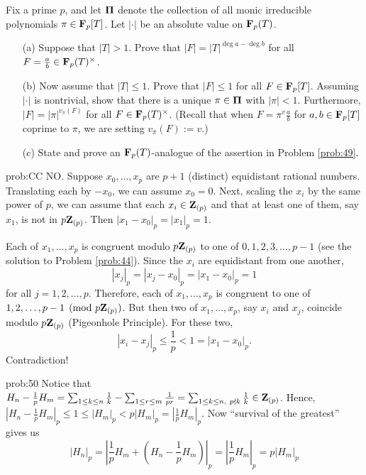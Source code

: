 \begin{challenge} Fix a prime $p$, and let $\bm{\mathrm{\Pi}}$ denote the collection of all monic irreducible polynomials $\pi \in \mathbf{F}_p[T]$. Let $|\cdot|$ be an absolute value on $\mathbf{F}_p(T)$.
\vspace{-0.12in}
\begin{enumerate}
\item[(a)] Suppose that $|T| > 1$. Prove that $|F| = |T|^{\deg{a}-\deg{b}}$ for all $F =\frac{a}{b}\in \mathbf{F}_p(T)^{\times}$.\item[(b)] Now assume that $|T| \le 1$. Prove that $|F|\le 1$ for all $F \in \mathbf{F}_p[T]$. Assuming $|\cdot|$ is nontrivial, show that there is a unique $\pi \in \raisebox{-0.25pt}{$\bmPi$}$ with $|\pi| < 1$. Furthermore, $|F| = |\pi|^{v_\pi(F)}$ for all $F \in \mathbf{F}_p(T)^{\times}$. (Recall that when $F=\pi^{v} \frac{a}{b}$ for $a,b \in \mathbf{F}_p[T]$ coprime to $\pi$, we are setting $v_{\pi}(F):=v$.)
\item[(c)] State and prove an $\mathbf{F}_p(T)$-analogue of the assertion in Problem \ref{prob:49}. 
\end{enumerate}

\end{challenge}

\begin{sol}{prob:CC} NO. Suppose $x_0, \dots, x_{p}$ are $p+1$ (distinct) equidistant rational numbers. Translating each by $-x_0$, we can assume $x_0= 0$. Next, scaling the $x_i$ by the same power of $p$, we can assume that each $x_i \in \mathbf{Z}_{(p)}$ and that at least one of them, say $x_1$, is not in $p\mathbf{Z}_{(p)}$. Then $|x_1-x_0|_p = |x_1|_p= 1$. 

Each of $x_1,\dots,x_{p}$ is congruent modulo $p\mathbf{Z}_{(p)}$ to one of $0,1,2,3,\dots,p-1$ (see the solution to Problem \ref{prob:44}). Since the $x_i$ are equidistant from one another, 
\[ |x_j|_p  =  |x_j-x_0|_p = |x_1-x_0|_p=1 \] for all $j=1,2,\dots,p$. Therefore, each of $x_1,\dots,x_p$ is congruent to one of $1,2,\dots,p-1 \pmod {p\mathbf{Z}_{(p)}}$. But then two of $x_1,\dots,x_{p}$, say $x_i$ and $x_j$, coincide modulo $p\mathbf{Z}_{(p)}$ (Pigeonhole Principle). For these two, 
\[ |x_i-x_j|_p \le \frac{1}{p} < 1 = |x_1-x_0|_p. \]
Contradiction!
\end{sol}


\begin{sol}{prob:50} Notice that $H_n - \frac{1}{p}H_{m} = \sum_{1 \le k \le n} \frac{1}{k} - \sum_{1 \le r \le m}\frac{1}{pr} = \sum_{1 \le k \le n,~p\nmid k}\frac{1}{k} \in \mathbf{Z}_{(p)}$. Hence, $|H_n - \frac{1}{p}H_m|_p \le 1 \le |H_m|_p < p|H_m|_p = |\frac{1}{p}H_m|_p$. Now ``survival of the greatest'' gives us
\[ |H_n|_p = \left|\frac{1}{p}H_m + \left(H_n - \frac{1}{p}H_m\right)\right|_p = \left|\frac{1}{p}H_m\right|_p = p |H_m|_{p} \]
\end{sol}

